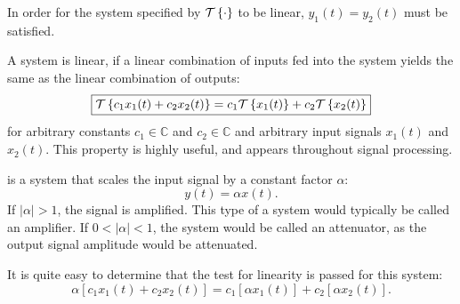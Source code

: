 \begin{marginfigure}[-3cm]
\begin{center}
\end{center}
\label{fig:linearity_block}
\caption{In order for the system specified by $\mathcal{T}\left\{\cdot\right\}$ to be linear, $y_1(t) = y_2(t)$ must be satisfied.}
\end{marginfigure}

A system is linear, if a linear combination of inputs fed into the system yields the same as the linear combination of outputs:
\begin{equation}
\boxed{
\spop[c_1 x_1(t) + c_2 x_2(t)] = c_1 \spop[x_1(t)] + c_2 \spop[ x_2(t) ]}
\label{def:linear_sys}
\end{equation}
for arbitrary constants $c_1 \in \mathbb{C}$ and $c_2 \in \mathbb{C}$ and arbitrary input signals $x_1(t)$ and $x_2(t)$. This property is highly useful, and appears throughout signal processing.

 is a system that scales the input signal by a constant factor $\alpha$:
\begin{equation}
  y(t) = \alpha x(t).
\end{equation}
If $|\alpha| >1$, the signal is amplified. This type of a system would typically be called an amplifier. If $0<|\alpha|<1$, the system would be called an attenuator, as the output signal amplitude would be attenuated.

It is quite easy to determine that the test for linearity is passed for this system:
\begin{equation}
\alpha [c_1 x_1(t) + c_2 x_2(t)] = c_1 [\alpha x_1(t)] + c_2 [\alpha x_2(t)].
\end{equation}

